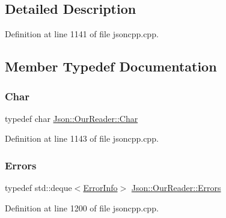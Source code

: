 \subsection{Detailed Description}


Definition at line 1141 of file jsoncpp.\+cpp.



\subsection{Member Typedef Documentation}
\hypertarget{class_json_1_1_our_reader_a0cd0bab4caa66594ab843ccd5f9dc239}{}\label{class_json_1_1_our_reader_a0cd0bab4caa66594ab843ccd5f9dc239} 
\subsubsection{\texorpdfstring{Char}{Char}}
{\footnotesize\ttfamily typedef char \hyperlink{class_json_1_1_our_reader_a0cd0bab4caa66594ab843ccd5f9dc239}{Json\+::\+Our\+Reader\+::\+Char}}



Definition at line 1143 of file jsoncpp.\+cpp.

\hypertarget{class_json_1_1_our_reader_a8cc69593ef7303e58e99bb5dbb767562}{}\label{class_json_1_1_our_reader_a8cc69593ef7303e58e99bb5dbb767562} 
\subsubsection{\texorpdfstring{Errors}{Errors}}
{\footnotesize\ttfamily typedef std\+::deque$<$\hyperlink{class_json_1_1_our_reader_1_1_error_info}{Error\+Info}$>$ \hyperlink{class_json_1_1_our_reader_a8cc69593ef7303e58e99bb5dbb767562}{Json\+::\+Our\+Reader\+::\+Errors}\hspace{0.3cm}{\ttfamily [private]}}



Definition at line 1200 of file jsoncpp.\+cpp.

\hypertarget{class_json_1_1_our_reader_a1bdc7bbc52ba87cae6b19746f2ee0189}{}\label{class_json_1_1_our_reader_a1bdc7bbc52ba87cae6b19746f2ee0189} 
